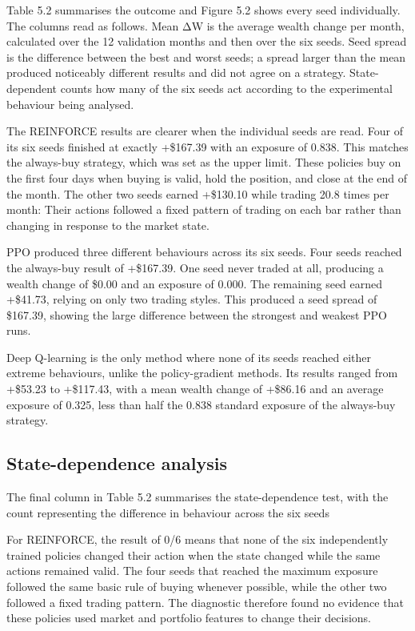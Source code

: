 Table 5.2 summarises the outcome and Figure 5.2 shows every seed
individually. The columns read as follows. Mean ΔW is the average wealth
change per month, calculated over the 12 validation months and then over
the six seeds. Seed spread is the difference between the best and worst
seeds; a spread larger than the mean produced noticeably different
results and did not agree on a strategy. State-dependent counts how many
of the six seeds act according to the experimental behaviour being
analysed.

The REINFORCE results are clearer when the individual seeds are read.
Four of its six seeds finished at exactly +\$167.39 with an exposure of
0.838. This matches the always-buy strategy, which was set as the upper
limit. These policies buy on the first four days when buying is valid,
hold the position, and close at the end of the month. The other two
seeds earned +\$130.10 while trading 20.8 times per month: Their actions
followed a fixed pattern of trading on each bar rather than changing in
response to the market state.

PPO produced three different behaviours across its six seeds. Four seeds
reached the always-buy result of +\$167.39. One seed never traded at
all, producing a wealth change of \$0.00 and an exposure of 0.000. The
remaining seed earned +\$41.73, relying on only two trading styles. This
produced a seed spread of \$167.39, showing the large difference between
the strongest and weakest PPO runs.

Deep Q-learning is the only method where none of its seeds reached
either extreme behaviours, unlike the policy-gradient methods. Its
results ranged from +\$53.23 to +\$117.43, with a mean wealth change of
+\$86.16 and an average exposure of 0.325, less than half the 0.838
standard exposure of the always-buy strategy.

\subsection{State-dependence analysis}

The final column in Table 5.2 summarises the state-dependence test, with
the count representing the difference in behaviour across the six seeds

For REINFORCE, the result of 0/6 means that none of the six
independently trained policies changed their action when the state
changed while the same actions remained valid. The four seeds that
reached the maximum exposure followed the same basic rule of buying
whenever possible, while the other two followed a fixed trading pattern.
The diagnostic therefore found no evidence that these policies used
market and portfolio features to change their decisions.

